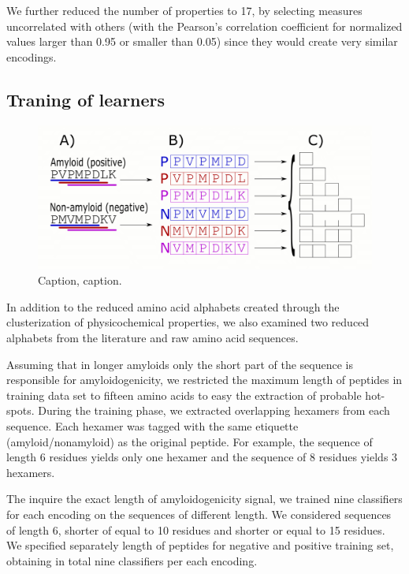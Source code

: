 \documentclass{bioinfo}
\begin{document}
\begin{methods}
We further reduced the number of properties to 17, by selecting measures uncorrelated with others (with the Pearson's correlation coefficient for normalized values larger than 0.95 or smaller than 0.05) since they would create very similar encodings.

\subsection{Traning of learners}


\begin{figure}[!tpb]%
\centerline{\includegraphics[width=\textwidth]{figures/ngram_scheme.png}}
\caption{Caption, caption.}\label{fig:01}
\end{figure}

In addition to the reduced amino acid alphabets created through the clusterization of physicochemical properties, we also examined two reduced alphabets from the literature and raw amino acid sequences.  

Assuming that in longer amyloids only the short part of the sequence is responsible for amyloidogenicity, 
we restricted the maximum length of peptides in training data set to fifteen amino acids to easy the extraction of probable hot-spots. During the training phase, we extracted overlapping hexamers from each sequence. Each hexamer was tagged with the same etiquette (amyloid/nonamyloid) as the original peptide. For example, the sequence of length 6 residues yields only one hexamer and the sequence of 8 residues yields 3 hexamers. 

The inquire the exact length of amyloidogenicity signal, we trained nine classifiers for each encoding on the sequences of different length. We considered sequences of length 6, shorter of equal to 10 residues and shorter or equal to 15 residues. We specified separately length of peptides for negative and positive training set, obtaining in total nine classifiers per each encoding.


\end{methods}
\end{document}
